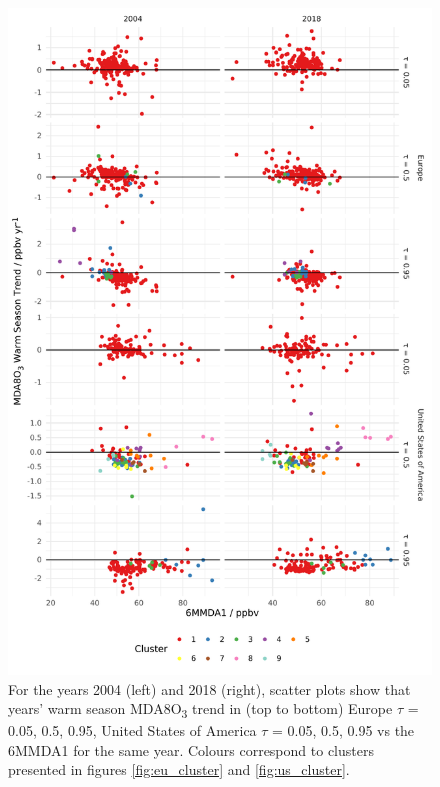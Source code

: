 \documentclass[journal abbreviation, manuscript]{copernicus}
\begin{document}
\begin{figure}[p]
\centering
\includegraphics[height=0.9\textheight]{figures/paper_figures/f10_mda8_warm_cluster_mda8_6mmda1.pdf}
\caption{For the years 2004 (left) and 2018 (right), scatter plots show that years' warm season MDA8O\textsubscript{3} trend in (top to bottom) Europe $\tau$ = 0.05, 0.5, 0.95, United States of America $\tau$ = 0.05, 0.5, 0.95 vs the 6MMDA1 for the same year. Colours correspond to clusters presented in figures \ref{fig:eu_cluster} and \ref{fig:us_cluster}.}
\label{fig:mda8_warm_cluster_mda8_6mmda1}
\end{figure}
\clearpage
\end{document}

